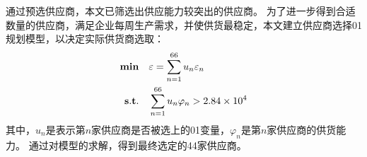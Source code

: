 通过预选供应商，本文已筛选出供应能力较突出的供应商。
为了进一步得到合适数量的供应商，满足企业每周生产需求，并使供货最稳定，本文建立供应商选择0\textendash1规划模型，以决定实际供货商选取：
\begin{equation}
\begin{split}
{\bf min}\quad &\varepsilon=\sum_{n=1}^{66} u_n\varepsilon_n \\
{\bf s.t.}\quad &\sum_{n=1}^{66} u_n\varphi_n > 2.84\times 10^4
\end{split}
\end{equation}
其中，$u_n$是表示第$n$家供应商是否被选上的0\textendash1变量，$\varphi_n$是第$n$家供应商的供货能力。
通过对模型的求解，得到最终选定的44家供应商。